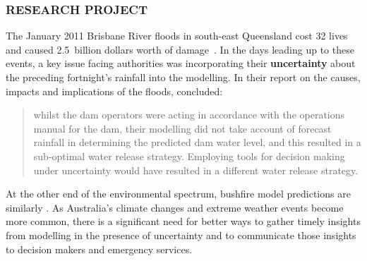 \documentclass[a4paper,fontsize=12pt]{scrartcl}
\begin{document}
\subsubsection*{RESEARCH PROJECT}

The January 2011 Brisbane River floods in south-east Queensland cost
32 lives and caused 2.5~billion dollars worth of
damage~\parencite{vandenhonert_2011_2011}. In the days leading up to
these events, a key issue facing authorities was incorporating their
\textbf{uncertainty} about the preceding fortnight's rainfall into the
modelling. In their report on the causes, impacts and implications of
the floods, \textcite[p1170]{vandenhonert_2011_2011} concluded:
\blockquote{whilst the dam operators were acting in accordance with
  the operations manual for the dam, their modelling did not take
  account of forecast rainfall in determining the predicted dam water
  level, and this resulted in a sub-optimal water release strategy.
  Employing tools for decision making under uncertainty would have
  resulted in a different water release strategy.} 
At the other end of
the environmental spectrum, bushfire model predictions are similarly
. As Australia's climate changes and extreme weather
events become more common, there is a significant need for better ways to
gather timely insights from modelling in the presence of uncertainty and to communicate those insights to 
decision makers and emergency services.
\end{document}

